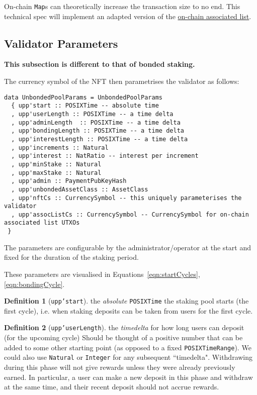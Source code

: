 \documentclass[10pt, a4paper]{article}
\theoremstyle{definition}
\newtheorem{definition}{Definition}[section]
\begin{document}
On-chain \texttt{Map}s can theoretically increase the transaction size to no end.  This technical spec will implement an adapted version of the  \href{https://github.com/Plutonomicon/plutonomicon/blob/main/assoc.md}{on-chain associated list}.


\subsection{Validator Parameters}\label{subsection:validatorParams}
\textbf{This subsection is different to that of bonded staking.}

The currency symbol of the NFT then parametrises the validator as follows:
\begin{verbatim}
data UnbondedPoolParams = UnbondedPoolParams
  { upp'start :: POSIXTime -- absolute time
  , upp'userLength :: POSIXTime -- a time delta
  , upp'adminLength  :: POSIXTime -- a time delta
  , upp'bondingLength :: POSIXTime -- a time delta
  , upp'interestLength :: POSIXTime -- a time delta
  , upp'increments :: Natural
  , upp'interest :: NatRatio -- interest per increment
  , upp'minStake :: Natural
  , upp'maxStake :: Natural
  , upp'admin :: PaymentPubKeyHash
  , upp'unbondedAssetClass :: AssetClass
  , upp'nftCs :: CurrencySymbol -- this uniquely parameterises the validator
  , upp'assocListCs :: CurrencySymbol -- CurrencySymbol for on-chain associated list UTXOs
 }
\end{verbatim}
The parameters are configurable by the administrator/operator at the start and fixed for the duration of the staking period.

These parameters are visualised in Equations~\ref{eqn:startCycles}, \ref{eqn:bondingCycle}.

\begin{definition}[\texttt{upp'start}]\label{def:upp'start}
the \textit{absolute} \texttt{POSIXTime} the staking pool starts (the first cycle), i.e. when staking deposits can be taken from users for the first cycle.
\end{definition}

\begin{definition}[\texttt{upp'userLength}]\label{def:upp'userLength}
the \textit{timedelta} for how long users can deposit (for the upcoming cycle) Should be thought of a positive number that can be added to some other starting point (as opposed to a fixed \texttt{POSIXTimeRange}). We could also use \texttt{Natural} or \texttt{Integer} for any subsequent ``timedelta".  Withdrawing during this phase will not give rewards unless they were already previously earned. In particular, a user can make a new deposit in this phase and withdraw at the same time, and their recent deposit should not accrue rewards. 
\end{definition}
\end{document}

